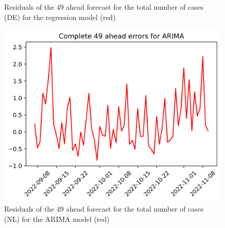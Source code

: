 \begin{figure}
\begin{minipage}{.32\textwidth}
  \caption{Residuals of the 49 ahead forecast for the total number of cases (DE) for the regression model (red)}
  \label{fig:tot_cases_error_49_RM_DE}
\end{minipage}
\begin{minipage}{.32\textwidth}
  \centering
  \includegraphics[width=\linewidth]{pics/49_ah/49_ahead_errors_ARIMA.png}
  \caption{Residuals of the 49 ahead forecast for the total number of cases (NL) for the ARIMA model (red)}
  \label{fig:tot_cases_error_49_ARIMA}
\end{minipage}

\end{figure}
